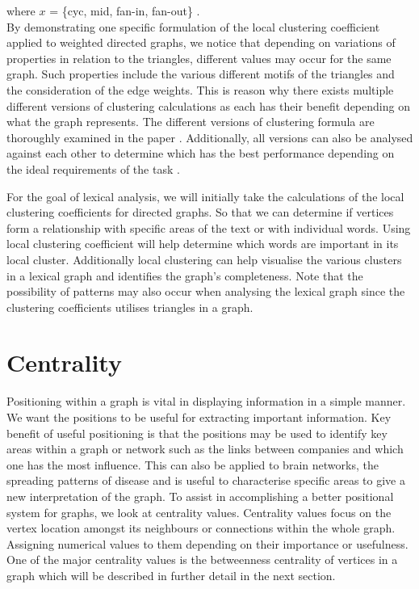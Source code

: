 where $x$ = \{cyc, mid, fan-in, fan-out\} .\\

By demonstrating one specific formulation of the local clustering coefficient applied to weighted directed graphs, we notice that depending on variations of properties in relation to the triangles, different values may occur for the same graph. Such properties include the various different motifs of the triangles and the consideration of the edge weights. This is reason why there exists multiple different versions of clustering calculations as each has their benefit depending on what the graph represents. The different versions of clustering formula are thoroughly examined in the paper \cite{PhysRevResearch.3.043124}. Additionally, all versions can also be analysed against each other to determine which has the best performance depending on the ideal requirements of the task \cite{CLEMENTE201826}.

For the goal of lexical analysis, we will initially take the calculations of the local clustering coefficients for directed graphs. So that we can determine if vertices form a relationship with specific areas of the text or with individual words. Using local clustering coefficient will help determine which words are important in its local cluster. Additionally local clustering can help visualise the various clusters in a lexical graph and identifies the graph's completeness. Note that the possibility of patterns may also occur when analysing the lexical graph since the clustering coefficients utilises triangles in a graph. 

\section{Centrality}
Positioning within a graph is vital in displaying information in a simple manner. We want the positions to be useful for extracting important information. Key benefit of useful positioning is that the positions may be used to identify key areas within a graph or network such as the links between companies and which one has the most influence. This can also be applied to brain networks, the spreading patterns of disease and is useful to characterise specific areas to give a new interpretation of the graph. To assist in accomplishing a better positional system for graphs, we look at centrality values. Centrality values focus on the vertex location amongst its neighbours or connections within the whole graph. Assigning numerical values to them depending on their importance or usefulness. One of the major centrality values is the betweenness centrality of vertices in a graph which will be described in further detail in the next section.

